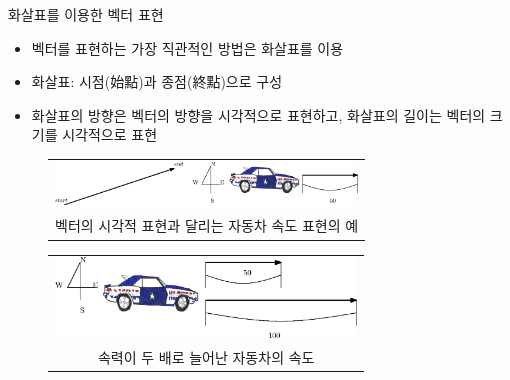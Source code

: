 \documentclass{beamer}
\begin{document}
\begin{frame}{화살표를 이용한 벡터 표현}
\begin{itemize}
\item 벡터를 표현하는 가장 직관적인 방법은 화살표를 이용
\item 화살표: 시점(始點)과 종점(終點)으로 구성 
\item 화살표의 방향은 벡터의 방향을 시각적으로 표현하고, 화살표의 길이는 벡터의 크기를 시각적으로 표현
\end{itemize}

\begin{figure}
\begin{tabular}{c}
\includegraphics[width=8cm]{Math_vector/vectorExpression.eps}\\
{\tiny 벡터의 시각적 표현과 달리는 자동차 속도 표현의 예}
\end{tabular}
\end{figure}

\begin{figure}
\begin{tabular}{c}
\includegraphics[width=8cm]{Math_vector/increasedSpeed.eps}\\
{\tiny 속력이 두 배로 늘어난 자동차의 속도}
\end{tabular}
\end{figure}

\end{frame}
\end{document}
